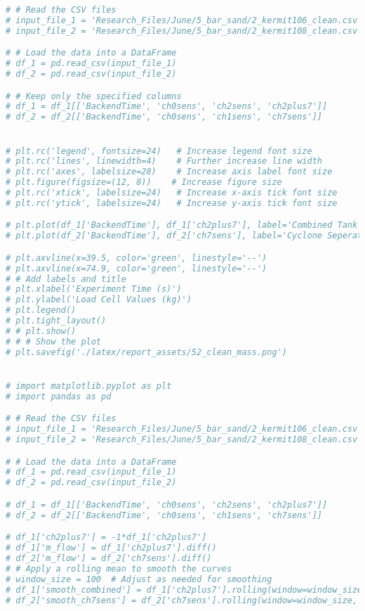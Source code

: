 \begin{lstlisting}[language=Python, caption={Example Python code for Mass Flow Analysis}]
# # Read the CSV files
# input_file_1 = 'Research_Files/June/5_bar_sand/2_kermit106_clean.csv'  # 0 2 7
# input_file_2 = 'Research_Files/June/5_bar_sand/2_kermit108_clean.csv'  # 0 1 7

# # Load the data into a DataFrame
# df_1 = pd.read_csv(input_file_1)
# df_2 = pd.read_csv(input_file_2)

# # Keep only the specified columns
# df_1 = df_1[['BackendTime', 'ch0sens', 'ch2sens', 'ch2plus7']]
# df_2 = df_2[['BackendTime', 'ch0sens', 'ch1sens', 'ch7sens']]


# plt.rc('legend', fontsize=24)   # Increase legend font size
# plt.rc('lines', linewidth=4)    # Further increase line width
# plt.rc('axes', labelsize=28)    # Increase axis label font size
# plt.figure(figsize=(12, 8))    # Increase figure size
# plt.rc('xtick', labelsize=24)   # Increase x-axis tick font size
# plt.rc('ytick', labelsize=24)   # Increase y-axis tick font size

# plt.plot(df_1['BackendTime'], df_1['ch2plus7'], label='Combined Tank', color='purple')
# plt.plot(df_2['BackendTime'], df_2['ch7sens'], label='Cyclone Seperator', color='orange')

# plt.axvline(x=39.5, color='green', linestyle='--')
# plt.axvline(x=74.9, color='green', linestyle='--')
# # Add labels and title
# plt.xlabel('Experiment Time (s)')
# plt.ylabel('Load Cell Values (kg)')
# plt.legend()
# plt.tight_layout()
# # plt.show()
# # # Show the plot
# plt.savefig('./latex/report_assets/52_clean_mass.png')


# import matplotlib.pyplot as plt
# import pandas as pd

# # Read the CSV files
# input_file_1 = 'Research_Files/June/5_bar_sand/2_kermit106_clean.csv'  # 0 2 7
# input_file_2 = 'Research_Files/June/5_bar_sand/2_kermit108_clean.csv'  # 0 1 7

# # Load the data into a DataFrame
# df_1 = pd.read_csv(input_file_1)
# df_2 = pd.read_csv(input_file_2)

# df_1 = df_1[['BackendTime', 'ch0sens', 'ch2sens', 'ch2plus7']]
# df_2 = df_2[['BackendTime', 'ch0sens', 'ch1sens', 'ch7sens']]

# df_1['ch2plus7'] = -1*df_1['ch2plus7']
# df_1['m_flow'] = df_1['ch2plus7'].diff()
# df_2['m_flow'] = df_2['ch7sens'].diff()
# # Apply a rolling mean to smooth the curves
# window_size = 100  # Adjust as needed for smoothing
# df_1['smooth_combined'] = df_1['ch2plus7'].rolling(window=window_size, center=True, min_periods=1).mean()
# df_2['smooth_ch7sens'] = df_2['ch7sens'].rolling(window=window_size, center=True, min_periods=1).mean()


\end{lstlisting}
